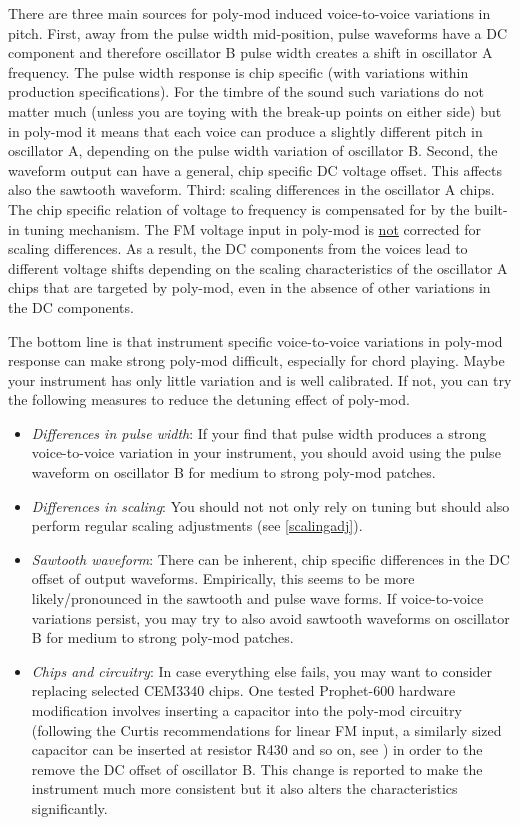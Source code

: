 \documentclass[landscape, 11pt, oneside, twoside]{report}
\newenvironment{flowtext}{\addmargin[0cm]{0cm}}{\endaddmargin} %
\begin{document}
\begin{flowtext}
There are three main sources for poly-mod induced voice-to-voice variations in pitch. First, away from the pulse width mid-position, pulse waveforms have a DC component and therefore oscillator B pulse width creates a shift in oscillator A frequency. The pulse width response is chip specific (with variations within production specifications). For the timbre of the sound such variations do not matter much (unless you are toying with the break-up points on either side) but in poly-mod it means that each voice can produce a slightly different pitch in oscillator A, depending on the pulse width variation of oscillator B. Second, the waveform output can have a general, chip specific DC voltage offset. This affects also the sawtooth waveform. Third: scaling differences in the oscillator A chips. The chip specific relation of voltage to frequency is compensated for by the built-in tuning mechanism. The FM voltage input in poly-mod is \underline{not} corrected for scaling differences. As a result, the DC components from the voices lead to different voltage shifts depending on the scaling characteristics of the oscillator A chips that are targeted by poly-mod, even in the absence of other variations in the DC components. 

The bottom line is that instrument specific voice-to-voice variations in poly-mod response can make strong poly-mod difficult, especially for chord playing. Maybe your instrument has only little variation and is well calibrated. If not, you can try the following measures to reduce the detuning effect of poly-mod. 

\begin{itemize}
  \item \textit{Differences in pulse width}: If your find that pulse width produces a strong voice-to-voice variation in your instrument, you should avoid using the pulse waveform on oscillator B for medium to strong poly-mod patches.      
  \item \textit{Differences in scaling}: You should not not only rely on tuning but should also perform regular scaling adjustments (see \ref{scalingadj}).
  \item \textit{Sawtooth waveform}: There can be inherent, chip specific differences in the DC offset of output waveforms. Empirically, this seems to be more likely/pronounced in the sawtooth and pulse wave forms. If voice-to-voice variations persist, you may try to also avoid sawtooth waveforms on oscillator B for medium to strong poly-mod patches.
  \item \textit{Chips and circuitry}: In case everything else fails, you may want to consider replacing selected CEM3340 chips. One tested Prophet-600 hardware modification involves inserting a capacitor into the poly-mod circuitry (following the Curtis recommendations for linear FM input, a similarly sized capacitor can be inserted at resistor R430 and so on, see \cite{p600siservicemanual}) in order to the remove the DC offset of oscillator B. This change is reported to make the instrument much more consistent but it also alters the characteristics significantly.
\end{itemize}


\end{flowtext}
\end{document}
